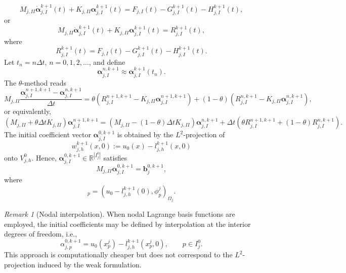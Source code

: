\documentclass[a4paper, 11pt]{article}
\theoremstyle{remark}
\newtheorem{remark}[equation]{Remark}
\begin{document}
\begin{equation*}
    M_{j, II} \dot{\boldsymbol{\alpha}}_{j, I}^{k+1}(t) + K_{j, II} \boldsymbol{\alpha}_{j, I}^{k+1}(t) = F_{j, I}(t) - G_{j, I}^{k+1}(t) - H_{j, I}^{k+1}(t),
\end{equation*}
or 
\begin{equation*}
    M_{j, II} \dot{\boldsymbol{\alpha}}_{j, I}^{k+1}(t) + K_{j, II} \boldsymbol{\alpha}_{j, I}^{k+1}(t) = R^{k+1}_{j, I}(t) ,
\end{equation*}
where
\begin{equation*}
     R^{k+1}_{j, I}(t) =  F_{j, I}(t) - G_{j, I}^{k+1}(t) - H_{j, I}^{k+1}(t).
\end{equation*}
Let $t_n = n \Delta t$, $n=0,1,2,\dots$, and define
\begin{equation*}
    \boldsymbol{\alpha}_{j, I}^{n, k+1} \approx \boldsymbol{\alpha}_{j, I}^{k+1}(t_n).    
\end{equation*}
The $\theta$-method reads
\begin{equation*}
    M_{j, II} \frac{\boldsymbol{\alpha}_{j, I}^{n+1, k+1} - \boldsymbol{\alpha}_{j, I}^{n, k+1}}{\Delta t} = \theta\left(R^{n+1, k+1}_{j, I} - K_{j, II} \boldsymbol{\alpha}_{j, I}^{n+1, k+1}\right) + (1-\theta)\left(R^{n, k+1}_{j, I} - K_{j, II} \boldsymbol{\alpha}_{j, I}^{n, k+1}\right),
\end{equation*}
or equivalently,
\begin{equation*}
    \left(M_{j, II} + \theta\Delta t K_{j, II}\right) \boldsymbol{\alpha}_{j, I}^{n+1, k+1} = \left(M_{j, II} - (1-\theta)\Delta t K_{j, II}\right)\boldsymbol{\alpha}_{j, I}^{n, k+1} + \Delta t\left(\theta R^{n+1, k+1}_{j, I} + (1-\theta)R^{n, k+1}_{j, I}\right).
\end{equation*}
The initial coefficient vector $\boldsymbol{\alpha}_{j, I}^{0,k+1}$ is obtained by the $L^2$-projection of 
\begin{equation*}
    w_{j,h}^{k+1}(x, 0) := u_0(x) - l_{j, h}^{k+1}(x,0)
\end{equation*}
onto $V^{0}_{j,h}$. Hence, $\boldsymbol{\alpha}_{j, I}^{0, k+1} \in \mathbb{R}^{|I_j^0|}$ satisfies
\begin{equation*}
    M_{j, II} \boldsymbol{\alpha}_{j, I}^{0,k+1} = \mathbf{b}_j^{0,k+1},
\end{equation*}
where
\begin{equation*}
    [\mathbf{b}_j^{0,k+1}]_p = (u_0 - l_{j, h}^{k+1}(0), \phi_{p}^{j})_{\Omega_j}.
\end{equation*}
\begin{remark}[Nodal interpolation]
    When nodal Lagrange basis functions are employed, the initial coefficients may be defined by interpolation at the interior degrees of freedom, i.e.,
    \begin{equation*}
        \alpha_{j,p}^{0,k+1} = u_0(x_{p}^{j}) - l_{j, h}^{k+1}(x_{p}^{j},0), \qquad p\in I_{j}^{0}.
    \end{equation*}
    This approach is computationally cheaper but does not correspond to the $L^2$-projection induced by the weak formulation.
\end{remark}
\end{document}
